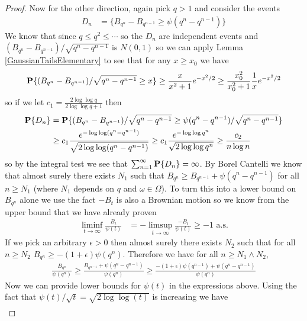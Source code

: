\begin{proof}
Now for the other direction, again pick $q > 1$ and consider the
events
\begin{align*}
D_n &= \lbrace B_{q^n} - B_{q^{n-1}} \geq \psi(q^n - q^{n-1}) \rbrace
\end{align*}
We know that since $q \leq q^2 \leq \cdots$ so the $D_n$ are
independent events and $(B_{q^n} - B_{q^{n-1}})/\sqrt{q^n - q^{n-1}}$ is
$N(0,1)$ so we can apply Lemma \ref{GaussianTailsElementary} to see
that
for any $x \geq x_0$ we have
\begin{align*}
\textbf{P}\{(B_{q^n} - B_{q^{n-1}})/\sqrt{q^n -  q^{n-1}} \geq x\} \geq
\frac{x}{x^2+1} e^{-x^2/2} \geq \frac{x_0^2}{x_0^2+1} \frac{1}{x} e^{-x^2/2} 
\end{align*}
so if we let $c_1 =
\frac{2 \log \log q}{2 \log \log q+1}$ then 
\begin{align*}
\textbf{P}\{D_n\} &= \textbf{P}\{(B_{q^n} - B_{q^{n-1}})/\sqrt{q^n -
  q^{n-1}} \geq \psi(q^n - q^{n-1})/\sqrt{q^n - q^{n-1}} \} \\
&\geq c_1 \frac{e^{-\log \log (q^n - q^{n-1})}}{\sqrt{2 \log \log (q^n -
    q^{n-1})}}
\geq c_1 \frac{e^{-\log \log q^n}}{\sqrt{2 \log \log q^n}} \geq
\frac{c_2}{n \log n}
\end{align*}
so by the integral test we see that $\sum_{n=1}^\infty
\textbf{P}\{D_n\} = \infty$.  By Borel Cantelli we know that almost
surely there exists $N_1$ such that $B_{q^n} \geq B_{q^{n-1}} + \psi(q^n
- q^{n-1})$ for all $n \geq N_1$ (where $N_1$ depends on $q$ and $\omega
\in \Omega$).  To turn this into a lower bound on $B_{q^n}$ alone we
use the fact $-B_t$ is also a Brownian motion so we know from the
upper bound that we have already proven
\begin{align*}
\liminf_{t \to \infty} \frac{B_t}{\psi(t)} &= -\limsup_{t \to \infty}
\frac{-B_t}{\psi(t)} \geq -1 \text{ a.s.}
\end{align*}
If we pick an arbitrary $\epsilon > 0$ then almost surely there exists
$N_2$ such that for all $n \geq N_2$
$B_{q^n} \geq -(1 + \epsilon) \psi(q^n)$.  Therefore we have for all
$n \geq N_1 \wedge N_2$,
\begin{align*}
\frac{B_{q^n}}{\psi(q^n)} \geq \frac{B_{q^{n-1}} + \psi(q^n
- q^{n-1}) }{\psi(q^n)}
\geq \frac{-(1 + \epsilon) \psi(q^{n-1}) + \psi(q^n- q^{n-1})}{\psi(q^n)}
\end{align*}
Now we can provide lower bounds for $\psi(t)$ in the expressions
above.  Using the fact that $\psi(t)/\sqrt{t} = \sqrt{2 \log \log(t)}$ is increasing we have
\begin{align*}

\end{align*}
\end{proof}

